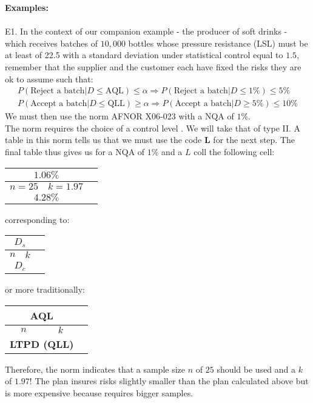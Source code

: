 	\begin{tcolorbox}[colframe=black,colback=white,sharp corners]
	\textbf{{\Large {}}Examples:}\\\\
	E1. In the context of our companion example - the producer of soft drinks - which receives batches of $10,000$ bottles whose pressure resistance (LSL) must be at least of 22.5 with a standard deviation under statistical control equal to $1.5$, remember that the supplier and the customer each have fixed the risks they are ok to assume such that:
	\begin{gather*}
			P(\text{Reject a batch}|D\leq \text{AQL})\leq \alpha\Rightarrow  P(\text{Reject a batch}|D\leq 1\%)\leq 5\%\\
			P(\text{Accept a batch}|D\leq \text{QLL})\geq \alpha\Rightarrow  P(\text{Accept a batch}|D\geq 5\%)\leq 10\%
	\end{gather*}
	We must then use the norm AFNOR X06-023 with a NQA of $1\%$.\\

	The norm requires the choice of a control level . We will take that of type II. A table in this norm tells us that we must use the code \textbf{L} for the next step. The final table thus gives us for a NQA of $1\%$ and a $L$ coll the following cell:
	\begin{center}
	  \begin{tabular}{|c|c|c|}
	  \hline
	    \multicolumn{2}{|c|}{$1.06\%$} \\ \hline
		$n=25$ & $k=1.97$ \\ \hline
		\multicolumn{2}{|c|}{$4.28\%$} \\ \hline
	  \end{tabular}
	\end{center}
	corresponding to:
	\begin{center}
	  \begin{tabular}{|c|c|c|}
	  \hline
	    \multicolumn{2}{|c|}{$D_s$} \\ \hline
		$n$ & $k$ \\ \hline
		\multicolumn{2}{|c|}{$D_c$} \\ \hline
	  \end{tabular}
	\end{center}
	or more traditionally:
	\begin{center}
	  \begin{tabular}{|c|c|c|}
	  \hline
	    \multicolumn{2}{|c|}{\textbf{AQL}} \\ \hline
		$n$ & $k$ \\ \hline
		\multicolumn{2}{|c|}{\textbf{LTPD (QLL)}} \\ \hline
	  \end{tabular}
	\end{center}
	Therefore, the norm indicates that a sample size $n$ of $25$ should be used and a $k$ of $1.97$! The plan insures risks slightly smaller than the plan calculated above but is more expensive because requires bigger samples.
	\end{tcolorbox}
